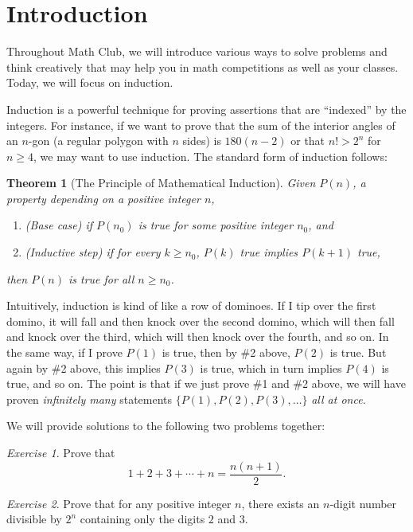 \documentclass{article}
\newtheorem{theorem}{Theorem}[section]
\theoremstyle{definition}
\theoremstyle{remark}
\newtheorem{exercise}{Exercise}
\begin{document}
\section{Introduction}

Throughout Math Club, we will introduce various ways to solve problems and think creatively that may help you in math competitions as well as your classes. Today, we will focus on  induction.

Induction is a powerful technique for proving assertions that are ``indexed'' by the integers. For instance, if we want to prove that the sum of the interior angles of an \(n\)-gon (a regular polygon with $n$ sides) is \(180(n-2)\) or that \(n!>2^n\) for \(n\geq 4\), we may want to use induction. The standard form of induction follows:

\begin{theorem}[The Principle of Mathematical Induction]
Given \(P(n)\), a property depending on a positive integer \(n\),
\begin{enumerate}
    \item (Base case) if \(P(n_0)\) is true for some positive integer \(n_0\), and
    \item (Inductive step) if for every \(k\geq n_0\), \(P(k)\) true implies \(P(k+1)\) true,
\end{enumerate}
then \(P(n)\) is true for all \(n\geq n_0\).
\end{theorem}
Intuitively, induction is kind of like a row of dominoes. If I tip over the first domino, it will fall and then knock over the second domino, which will then fall and knock over the third, which will then knock over the fourth, and so on. In the same way, if I prove $P(1)$ is true, then by \#2 above, $P(2)$ is true. But again by \#2 above, this implies $P(3)$ is true, which in turn implies $P(4)$ is true, and so on. The point is that if we just prove \#1 and \#2 above, we will have proven \emph{infinitely many} statements $\{P(1),P(2),P(3),\dots\}$ \emph{all at once}.

We will provide solutions to the following two problems together:

\begin{exercise}
    Prove that
    \[1+2+3+\cdots+n = \frac{n(n+1)}{2}.\]
\end{exercise}

\begin{exercise}
    Prove that for any positive integer \(n\), there exists an \(n\)-digit number divisible by \(2^n\) containing only the digits \(2\) and \(3\).
\end{exercise}
\end{document}
